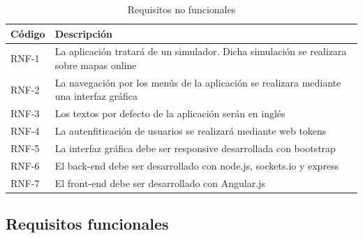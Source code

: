 \begin{table}[H]
	\begin{center}
		\begin{tabular}{|p{1.5cm}| p{10.5cm}|}
			\hline
			Código & Descripción \\
			\hline
			RNF-1  & La aplicación tratará de un simulador. Dicha simulación se realizara sobre mapas online\\ \hline
			RNF-2  & La navegación por los menús de la aplicación se realizara mediante una interfaz gráfica\\ \hline
			RNF-3  & Los textos por defecto de la aplicación serán en inglés\\ \hline
			RNF-4  & La autenfiticación de usuarios se realizará mediante web tokens\\ \hline
			RNF-5  & La interfaz gráfica debe ser responsive desarrollada con bootstrap\\ \hline
			RNF-6  & El back-end debe ser desarrollado con node.js, sockets.io y express \\ \hline
			RNF-7  & El front-end debe ser desarrollado con Angular.js\\ \hline
		\end{tabular}
		\caption{Requisitos no funcionales}
		\label{tabla:requisitosNoFuncionales}
	\end{center}
\end{table}

\newpage

\subsection{Requisitos funcionales}


